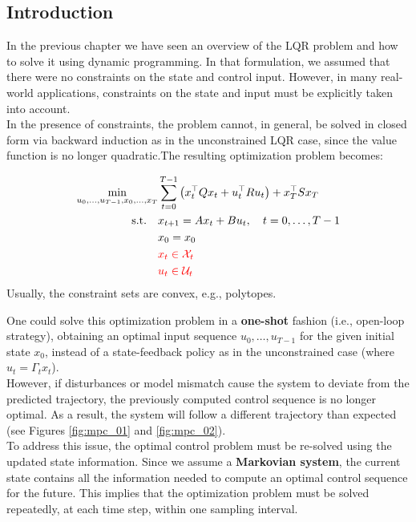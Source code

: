 \subsection{Introduction}
In the previous chapter we have seen an overview of the LQR problem and how to solve it using dynamic programming. In that formulation, we assumed that there were no constraints on the state and control input. However, in many real-world applications, constraints on the state and input must be explicitly taken into account.\\
In the presence of constraints, the problem cannot, in general, be solved in closed form via backward induction as in the unconstrained LQR case, since the value function is no longer quadratic.The resulting optimization problem becomes:

\begin{theorembox}
\begin{align*}
\min_{u_0, \ldots, u_{T-1},x_0,\dots,x_T} &\sum_{t=0}^{T-1} \left( x_t^\top Q x_t + u_t^\top R u_t \right) + x_T^\top S x_T \\
\text{s.t.} \quad & x_{t+1} = A x_t + B u_t, \quad t=0, \ldots, T-1 \\
& x_0 = x_0 \\
& \textcolor{red}{x_t \in \mathcal{X}_t}\\
& \textcolor{red}{u_t \in \mathcal{U}_t}
\end{align*}
Usually, the constraint sets are convex, e.g., polytopes.
\end{theorembox}

One could solve this optimization problem in a \textbf{one-shot} fashion (i.e., open-loop strategy), obtaining an optimal input sequence $u_0, \ldots, u_{T-1}$ for the given initial state $x_0$, instead of a state-feedback policy as in the unconstrained case (where $u_t = \Gamma_t x_t$).\\ However, if disturbances or model mismatch cause the system to deviate from the predicted trajectory, the previously computed control sequence is no longer optimal. As a result, the system will follow a different trajectory than expected (see Figures \ref{fig:mpc_01} and \ref{fig:mpc_02}).\\

To address this issue, the optimal control problem must be re-solved using the updated state information. Since we assume a \textbf{Markovian system}, the current state contains all the information needed to compute an optimal control sequence for the future. This implies that the optimization problem must be solved repeatedly, at each time step, within one sampling interval.

